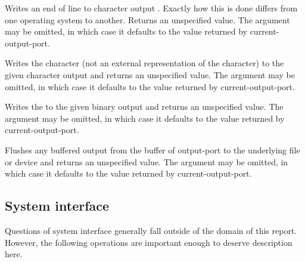 \begin{entry}{%
}

Writes an end of line to character output .  Exactly how this
is done differs
from one operating system to another.  Returns an unspecified value.
The  argument may be omitted, in which case it defaults to the
value returned by {\cf current-output-port}.

\end{entry}


\begin{entry}{%
}

Writes the character  (not an external representation of the
character) to the given character output  and returns an unspecified
value.  The
 argument may be omitted, in which case it defaults to the value
returned by {\cf current-output-port}.

\end{entry}

\begin{entry}{%
}

Writes the  to
the given binary output  and returns an unspecified value.
The  argument may be omitted, in which case it defaults to
the value returned by {\cf current-output-port}.

\end{entry}

\begin{entry}{%
}

Flushes any buffered output from the buffer of output-port to the
underlying file or device and returns an unspecified value.
The  argument may be omitted, in which case it defaults to
the value returned by {\cf current-output-port}.

\end{entry}


\subsection{System interface}

Questions of system interface generally fall outside of the domain of this
report.  However, the following operations are important enough to
deserve description here.


